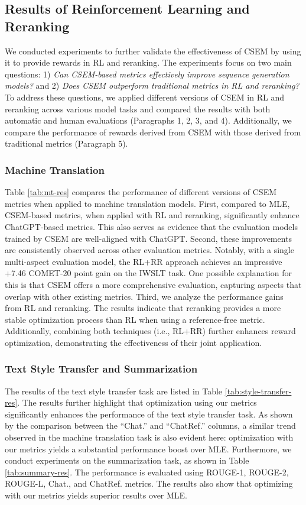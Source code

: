 \documentclass[lettersize,journal]{IEEEtran}
\begin{document}





\subsection{Results of Reinforcement Learning and Reranking}
We conducted experiments to further validate the effectiveness of CSEM by using it to provide rewards in RL and reranking. The experiments focus on two main questions: 1) \textit{Can CSEM-based metrics effectively improve sequence generation models?} and 2) \textit{Does CSEM outperform traditional metrics in RL and reranking?} To address these questions, we applied different versions of CSEM in RL and reranking across various model tasks and compared the results with both automatic and human evaluations (Paragraphs 1, 2, 3, and 4). Additionally, we compare the performance of rewards derived from CSEM with those derived from traditional metrics (Paragraph 5).
\subsubsection{Machine Translation}
Table \ref{tab:mt-res} compares the performance of different versions of CSEM metrics when applied to machine translation models. First, compared to MLE, CSEM-based metrics, when applied with RL and reranking, significantly enhance ChatGPT-based metrics. This also serves as evidence that the evaluation models trained by CSEM are well-aligned with ChatGPT. Second, these improvements are consistently observed across other evaluation metrics. Notably, with a single multi-aspect evaluation model, the RL+RR approach achieves an impressive +7.46 COMET-20 point gain on the IWSLT task. One possible explanation for this is that CSEM offers a more comprehensive evaluation, capturing aspects that overlap with other existing metrics. Third, we analyze the performance gains from RL and reranking. The results indicate that reranking provides a more stable optimization process than RL when using a reference-free metric. Additionally, combining both techniques (i.e., RL+RR) further enhances reward optimization, demonstrating the effectiveness of their joint application.

\subsubsection{Text Style Transfer and Summarization}
The results of the text style transfer task are listed in Table \ref{tab:style-transfer-res}. The results further highlight that optimization using our metrics significantly enhances the performance of the text style transfer task. As shown by the comparison between the ``Chat.'' and ``ChatRef.'' columns, a similar trend observed in the machine translation task is also evident here: optimization with our metrics yields a substantial performance boost over MLE. Furthermore, we conduct experiments on the summarization task, as shown in Table \ref{tab:summary-res}. The performance is evaluated using ROUGE-1, ROUGE-2, ROUGE-L, Chat., and ChatRef. metrics. The results also show that optimizing with our metrics yields superior results over MLE.
\end{document}
